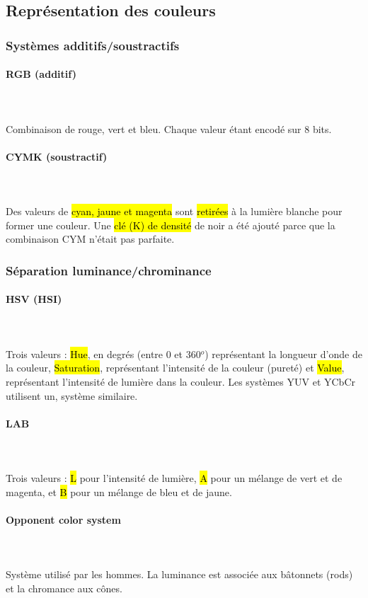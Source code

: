 \documentclass[letterpaper, 12pt]{article}
\newcommand{\alinea}{
\hspace*{0.5cm}}
\begin{document}
	\subsection{Représentation des couleurs}
		\subsubsection{Systèmes additifs/soustractifs}
			\paragraph{RGB (additif)}~\\~\\
				\alinea Combinaison de rouge, vert et bleu. Chaque valeur étant encodé sur 8 bits.
			\paragraph{CYMK (soustractif)} ~\\~\\
				\alinea Des valeurs de \hl{cyan, jaune et magenta} sont \hl{retirées} à la lumière blanche pour former une couleur.
					Une \hl{clé (K) de densité} de noir a été ajouté parce que la combinaison CYM n'était pas parfaite.
		\subsubsection{Séparation luminance/chrominance}
			\paragraph{HSV (HSI)}~\\~\\
				\alinea Trois valeurs : \hl{Hue}, en degrés (entre 0 et 360$^o$) représentant la longueur d'onde de la couleur,
					\hl{Saturation}, représentant l'intensité de la couleur (pureté) et \hl{Value}, représentant l'intensité de
					lumière dans la couleur. Les systèmes YUV et YCbCr utilisent un, système similaire.
			\paragraph{LAB}~\\~\\
				\alinea Trois valeurs : \hl{L} pour l'intensité de lumière, \hl{A} pour un mélange de vert et de magenta, et 
					\hl{B} pour un mélange de bleu et de jaune.
			\paragraph{Opponent color system}~\\~\\
				\alinea Système utilisé par les hommes. La luminance est associée aux bâtonnets (rods) et la chromance aux cônes.
\end{document}
